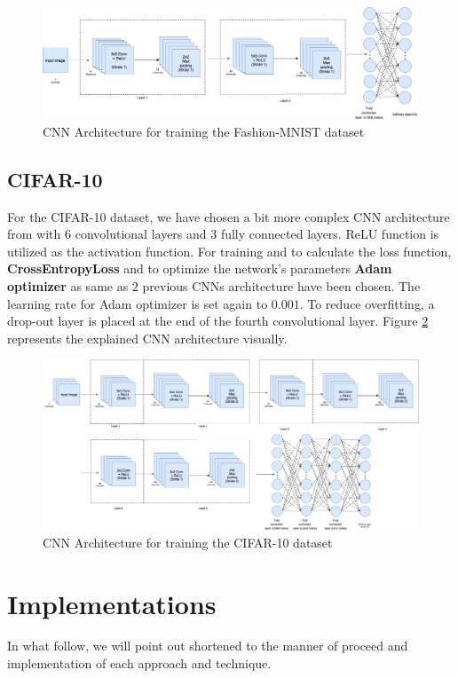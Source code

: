 \begin{figure}
  \centering
  \label{fig:Fashion_MNIST_CNN_Architecture}
  \includegraphics[width=1\textwidth]{fig/Fashion-MNIST-CNN-Architecture}
  \caption{CNN Architecture for training the Fashion-MNIST dataset}
\end{figure}

\subsection{CIFAR-10}
For the CIFAR-10 dataset, we have chosen a bit more complex CNN architecture from \cite{CIFAR_CNN_Architecture} with $6$
convolutional layers and $3$ fully connected layers. ReLU function is utilized as the activation
function. For training and to calculate the loss function, \textbf{CrossEntropyLoss} and
to optimize the network's parameters \textbf{Adam optimizer} as same as $2$ previous CNNs architecture have been
chosen. The learning rate for Adam optimizer is set again to $0.001$. To reduce overfitting, a
drop-out layer is placed at the end of the fourth convolutional layer. Figure \ref{fig:CIFAR_CNN_Architecture} represents the explained CNN architecture visually.


\begin{figure}
  \centering
  \label{fig:CIFAR_CNN_Architecture}
  \includegraphics[width=1\textwidth]{fig/CIFAR-CNN-Architecture}
  \caption{CNN Architecture for training the CIFAR-10 dataset}
\end{figure}

\section{Implementations}
In what follow, we will point out shortened to the manner of proceed and implementation of each
approach and technique.

